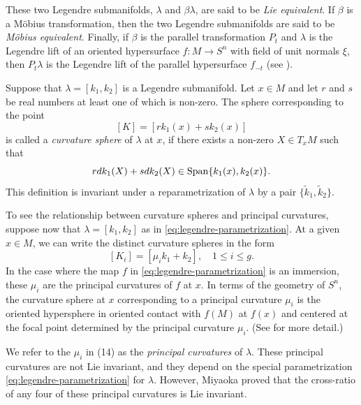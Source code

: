 \documentclass[12pt]{article}
\begin{document}
{These two Legendre
submanifolds, $\lambda$ and $\beta \lambda$, are said to be {\em Lie equivalent}.  
If $\beta$ is a M\"{o}bius transformation, then the two Legendre
submanifolds are said to be {\em M\"{o}bius equivalent}.
Finally, if $\beta$ is the parallel transformation $P_t$ and
$\lambda$ is the Legendre lift of an
oriented hypersurface $f:M \rightarrow S^n$ with field of unit normals $\xi$, then
$P_t\lambda$ is the Legendre lift of the
parallel hypersurface $f_{-t}$ (see \cite[p. 67]{Cec9}).

Suppose that $\lambda = [k_1 , k_2]$ is a Legendre submanifold.  Let
$x \in M$ and let $r$ and $s$ be real numbers at least one
of which is non-zero.  The sphere corresponding to the point
\begin{equation}
\label{eq:curvature-sphere}
[K] = [rk_1 (x) + sk_2 (x) ]
\end{equation}
is called a {\em curvature sphere} of $\lambda$ at $x$, if there
exists a non-zero $X \in T_x M$ such that
\begin{equation}
\label{eq:curv-sphere-derivative}
r dk_1 (X) + s dk_2 (X) \in {\rm Span} \{ k_1 (x),
k_2 (x) \} .
\end{equation}
This definition is invariant under a reparametrization of $\lambda$
by a pair $\{ \tilde{k} _1 , \tilde{k} _2 \}$.

To see the relationship between curvature spheres and principal
curvatures, suppose now that
$\lambda = [k_1 , k_2 ]$ as in \eqref{eq:legendre-parametrization}.  At a given
$x \in M$, we can write the distinct curvature spheres
in the form
\begin{equation}
\label{eq:distinct-curvature-spheres}
[K_i ] = [\mu _i k_1 + k_2 ], \quad 1\leq i \leq g .
\end{equation}
In the case where the map $f$ in \eqref{eq:legendre-parametrization} is an immersion, these
$\mu _i$ are the principal curvatures
of $f$ at $x$.  In terms of the geometry of $S^n$, the curvature
sphere at $x$ corresponding to a principal curvature $\mu _i$
is the oriented hypersphere in oriented contact with $f(M)$
at $f(x)$ and centered at the focal point determined by the
principal curvature $\mu _i$. (See \cite[pp. 64--82]{Cec9} for more detail.)

We refer to the $\mu_i$  in (14) as the {\em principal
curvatures} of $\lambda$.
These principal curvatures are not Lie
invariant, and they depend on the special parametrization \eqref{eq:legendre-parametrization}
for $\lambda$.  However, Miyaoka \cite{Mi2} proved that the
cross-ratio of any four of 
these principal curvatures is Lie invariant.

}
\end{document}
